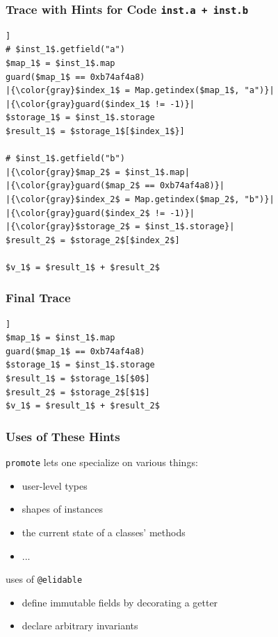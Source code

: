 \documentclass[utf8x]{beamer}
\begin{document}
\begin{frame}
  \frametitle{Trace with Hints for Code \texttt{inst.a + inst.b}}
\begin{lstlisting}[mathescape,escapechar=|,basicstyle=\ttfamily]]
# $inst_1$.getfield("a")
$map_1$ = $inst_1$.map
guard($map_1$ == 0xb74af4a8)
|{\color{gray}$index_1$ = Map.getindex($map_1$, "a")}|
|{\color{gray}guard($index_1$ != -1)}|
$storage_1$ = $inst_1$.storage
$result_1$ = $storage_1$[$index_1$}]

# $inst_1$.getfield("b")
|{\color{gray}$map_2$ = $inst_1$.map|
|{\color{gray}guard($map_2$ == 0xb74af4a8)}|
|{\color{gray}$index_2$ = Map.getindex($map_2$, "b")}|
|{\color{gray}guard($index_2$ != -1)}|
|{\color{gray}$storage_2$ = $inst_1$.storage}|
$result_2$ = $storage_2$[$index_2$]

$v_1$ = $result_1$ + $result_2$
\end{lstlisting}
\end{frame}

\begin{frame}
  \frametitle{Final Trace}
\begin{lstlisting}[mathescape,escapechar=|,basicstyle=\ttfamily]]
$map_1$ = $inst_1$.map
guard($map_1$ == 0xb74af4a8)
$storage_1$ = $inst_1$.storage
$result_1$ = $storage_1$[$0$]
$result_2$ = $storage_2$[$1$]
$v_1$ = $result_1$ + $result_2$
\end{lstlisting}
\end{frame}


\begin{frame}
  \frametitle{Uses of These Hints}
  \begin{block}{\texttt{promote} lets one specialize on various things:}
      \begin{itemize}
          \item user-level types
          \item shapes of instances
          \item the current state of a classes' methods
          \item ...
      \end{itemize}
  \end{block}
  \pause
  \begin{block}{uses of \texttt{@elidable}}
      \begin{itemize}
          \item define immutable fields by decorating a getter
          \item declare arbitrary invariants
      \end{itemize}
      
  \end{block}
\end{frame}
\end{document}
